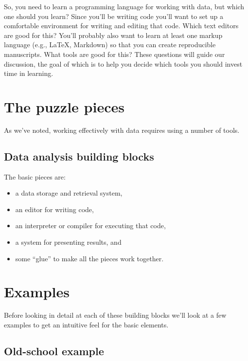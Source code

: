 \documentclass[]{book}
\providecommand{\tightlist}{%
  \setlength{\itemsep}{0pt}\setlength{\parskip}{0pt}}
\begin{document}
So, you need to learn a programming language for working with data, but which one should you learn? Since you'll be writing code you'll want to set up a comfortable environment for writing and editing that code. Which text editors are good for this? You'll probably also want to learn at least one markup language (e.g., LaTeX, Markdown) so that you can create reproducible manuscripts. What tools are good for this? These questions will guide our discussion, the goal of which is to help you decide which tools you should invest time in learning.

\hypertarget{the-puzzle-pieces}{%
\section{The puzzle pieces}\label{the-puzzle-pieces}}

As we've noted, working effectively with data requires using a number of tools.

\hypertarget{data-analysis-building-blocks}{%
\subsection{Data analysis building blocks}\label{data-analysis-building-blocks}}

The basic pieces are:

\begin{itemize}
\tightlist
\item
  a data storage and retrieval system,
\item
  an editor for writing code,
\item
  an interpreter or compiler for executing that code,
\item
  a system for presenting results, and
\item
  some ``glue'' to make all the pieces work together.
\end{itemize}

\hypertarget{examples}{%
\section{Examples}\label{examples}}

Before looking in detail at each of these building blocks we'll look at a few examples to get an intuitive feel for the basic elements.

\hypertarget{old-school-example}{%
\subsection{Old-school example}\label{old-school-example}}
\end{document}
